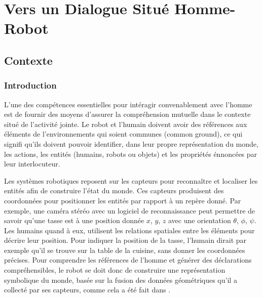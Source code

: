 \documentclass[a4paper,11pt,twoside]{StyleThese}
\begin{document}
\setcounter{chapter}{2} %
\dominitoc
\faketableofcontents
\fi

\chapter{Vers un Dialogue Situé Homme-Robot}
\label{chapter3}
\minitoc

\section{Contexte}

\subsection{Introduction}
L'une des compétences essentielles pour intéragir convenablement avec l'homme est de fournir des moyens d'assurer la compréhension mutuelle dans le contexte situé de l'activité jointe. Le robot et l'humain doivent avoir des références aux éléments de l'environnements qui soient communes (common ground), ce qui signifi qu'ils doivent pouvoir identifier, dans leur propre représentation du monde, les actions, les entités (humains, robots ou objets) et les propriétés énnoncées par leur interlocuteur.

Les systèmes robotiques reposent sur les capteurs pour reconnaître et localiser les entités afin de construire l'état du monde. Ces capteurs produisent des coordonnées pour positionner les entités par rapport à un repère donné. Par exemple, une caméra stéréo avec un logiciel de reconnaissance peut permettre de savoir qu'une tasse est à une position donnée  $x$, $y$, $z$ avec une orientation $\theta$, $\phi$, $\psi$.
Les humains quand à eux, utilisent les relations spatiales entre les éléments pour décrire leur position. Pour indiquer la position de la tasse, l'humain dirait par exemple qu'il se trouve sur la table de la cuisine, sans donner les coordonnées précises.
Pour comprendre les références de l'homme et générer des déclarations compréhensibles, le robot se doit donc de construire une représentation symbolique du monde, basée sur la fusion des données géométriques qu'il a collecté par ses capteurs, comme cela a été fait dans \cite{lemaignan2012grounding}.

\end{document}
